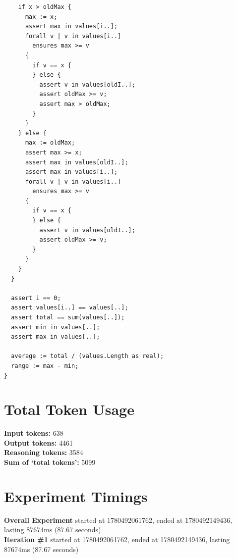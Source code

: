 \documentclass{article}
\begin{document}
\begin{lstlisting}
    if x > oldMax {
      max := x;
      assert max in values[i..];
      forall v | v in values[i..]
        ensures max >= v
      {
        if v == x {
        } else {
          assert v in values[oldI..];
          assert oldMax >= v;
          assert max > oldMax;
        }
      }
    } else {
      max := oldMax;
      assert max >= x;
      assert max in values[oldI..];
      assert max in values[i..];
      forall v | v in values[i..]
        ensures max >= v
      {
        if v == x {
        } else {
          assert v in values[oldI..];
          assert oldMax >= v;
        }
      }
    }
  }

  assert i == 0;
  assert values[i..] == values[..];
  assert total == sum(values[..]);
  assert min in values[..];
  assert max in values[..];

  average := total / (values.Length as real);
  range := max - min;
}
\end{lstlisting}
\section*{Total Token Usage}
\textbf{Input tokens: }638
\\\textbf{Output tokens: }4461
\\\textbf{Reasoning tokens: }3584
\\\textbf{Sum of `total tokens': }5099
\section*{Experiment Timings}
\textbf{Overall Experiment} started at 1780492061762, ended at 1780492149436, lasting 87674ms (87.67 seconds)
\\\textbf{Iteration \#1} started at 1780492061762, ended at 1780492149436, lasting 87674ms (87.67 seconds)
\end{document}
